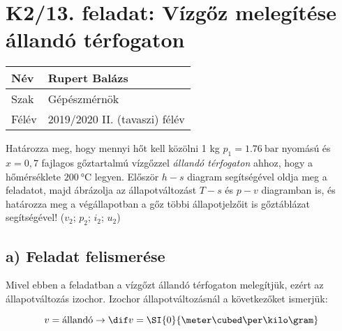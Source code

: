 \newcommand\pegy{0.176} %
\newcommand\TegyK{389.34} %
\newcommand\TegyC{116.19} %
\newcommand\vegy{0.699}
\newcommand\uegy{1913.2}
\newcommand\hegy{2036.3}
\newcommand\segy{5.4645}
\newcommand\xegy{0.7}
\newcommand\pvesszo{0.2575}
\newcommand\TvesszoK{401.52}
\newcommand\TvesszoC{128.37}
\newcommand\vvesszo{0.699}
\newcommand\uvesszo{2537.3}
\newcommand\hvesszo{2717.3}
\newcommand\svesszo{7.0419}
\newcommand\xvesszo{1}
\newcommand\pketto{0.3073}
\newcommand\TkettoK{473.15}
\newcommand\TkettoC{200}
\newcommand\vketto{0.699}
\newcommand\uketto{2649.5}
\newcommand\hketto{2864.3}
\newcommand\sketto{7.2992}

\newcommand\pontvastagsag{0.7 mm} %

\section*{K2/13. feladat: Vízgőz melegítése állandó térfogaton}
\begin{tabular}{ | p{2cm} | p{14cm} | } 
	\hline
	Név & Rupert Balázs \\ 
	\hline
	Szak & Gépészmérnök\\ 
	\hline
	Félév & 2019/2020 II. (tavaszi) félév \\ 
	\hline
\end{tabular}
\vspace{0.5cm}

	Határozza meg, hogy mennyi hőt kell közölni 1 kg $p_1=\SI{1,76}{\bar}$ nyomású és $x = 0,7$ fajlagos gőztartalmú vízgőzzel \textit{állandó térfogaton} ahhoz, hogy a hőmérséklete $\SI{200}{\celsius}$ legyen. Először $h-s$ diagram segítségével oldja meg a feladatot, majd ábrázolja az állapotváltozást $T-s$ és $p-v$ diagramban is, és határozza meg a végállapotban a gőz többi állapotjelzőit is gőztáblázat segítségével! ($v_2$; $p_2$; $i_2$; $u_2$)
	\vspace{2mm}

\subsection*{a) Feladat felismerése}
	Mivel ebben a feladatban a vízgőzt állandó térfogaton melegítjük, ezért az állapotváltozás izochor.
	Izochor állapotváltozásnál a következőket ismerjük:
	
\begin{equation}
	v=\textrm{állandó} \rightarrow \dif v=\SI{0}{\meter\cubed\per\kilo\gram}
\end{equation}

